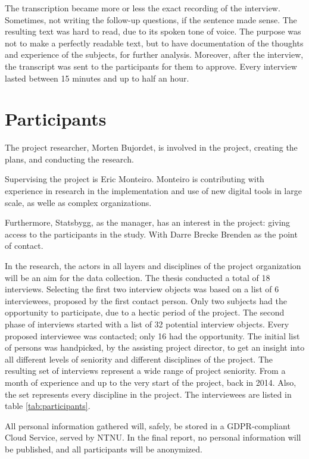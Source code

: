 The transcription became more or less the exact recording of the interview. Sometimes, not writing the follow-up questions, if the sentence made sense. The resulting text was hard to read, due to its spoken tone of voice. The purpose was not to make a perfectly readable text, but to have documentation of the thoughts and experience of the subjects, for further analysis. Moreover, after the interview, the transcript was sent to the participants for them to approve. Every interview lasted between 15 minutes and up to half an hour.

\section{Participants}
The project researcher, Morten Bujordet, is involved in the project, creating the plans, and conducting the research.
	 
Supervising the project is Eric Monteiro. Monteiro is contributing with experience in research in the implementation and use of new digital tools in large scale, as welle as complex organizations. 

Furthermore, Statsbygg, as the manager, has an interest in the project: giving access to the participants in the study. With Darre Brecke Brenden as the point of contact.
	 
In the research, the actors in all layers and disciplines of the project organization will be an aim for the data collection. The thesis conducted a total of 18 interviews. Selecting the first two interview objects was based on a list of 6 interviewees, proposed by the first contact person. Only two subjects had the opportunity to participate, due to a hectic period of the project.  The second phase of interviews started with a list of 32 potential interview objects. Every proposed interviewee was contacted; only 16 had the opportunity. The initial list of persons was handpicked, by the assisting project director, to get an insight into all different levels of seniority and different disciplines of the project. The resulting set of interviews represent a wide range of project seniority. From a month of experience and up to the very start of the project, back in 2014. Also, the set represents every discipline in the project. The interviewees are listed in table \ref{tab:participants}.

All personal information gathered will, safely, be stored in a GDPR-compliant Cloud Service, served by NTNU. In the final report, no personal information will be published, and all participants will be anonymized.



